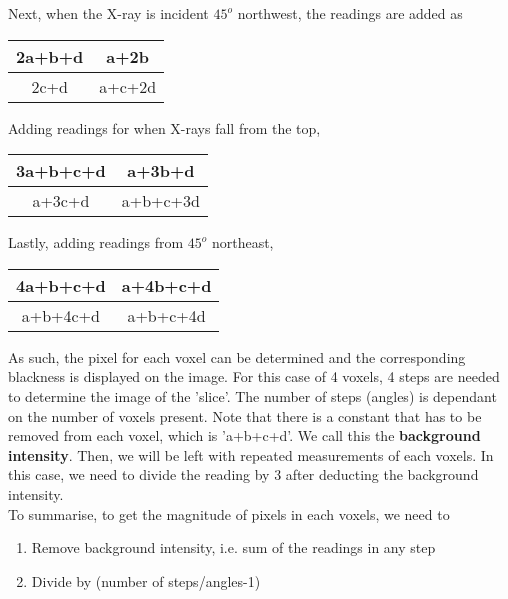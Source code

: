 \documentclass{article}
\begin{document}
 Next, when the X-ray is incident $45^o$ northwest, the readings are added as
 \begin{center}
    \begin{tabular}{|c|c|}
    \hline
    2a+b+d    &  a+2b\\
    \hline
    2c+d    & a+c+2d\\
    \hline
    \end{tabular}
\end{center}

Adding readings for when X-rays fall from the top,
 \begin{center}
    \begin{tabular}{|c|c|}
    \hline
    3a+b+c+d    &  a+3b+d\\
    \hline
    a+3c+d    & a+b+c+3d\\
    \hline
    \end{tabular}
\end{center}

Lastly, adding readings from $45^o$ northeast,
 \begin{center}
    \begin{tabular}{|c|c|}
    \hline
    4a+b+c+d    &  a+4b+c+d\\
    \hline
    a+b+4c+d    & a+b+c+4d\\
    \hline
    \end{tabular}
\end{center}

As such, the pixel for each voxel can be determined and the corresponding blackness is displayed on the image. For this case of 4 voxels, 4 steps are needed to determine the image of the 'slice'. The number of steps (angles) is dependant on the number of voxels present. Note that there is a constant that has to be removed from each voxel, which is 'a+b+c+d'. We call this the \textbf{background intensity}. Then, we will be left with repeated measurements of each voxels. In this case, we need to divide the reading by 3 after deducting the background intensity.
\\To summarise, to get the magnitude of pixels in each voxels, we need to
\begin{enumerate}
    \item Remove background intensity, i.e. sum of the readings in any step
    \item Divide by (number of steps/angles-1)
\end{enumerate}
\end{document}
